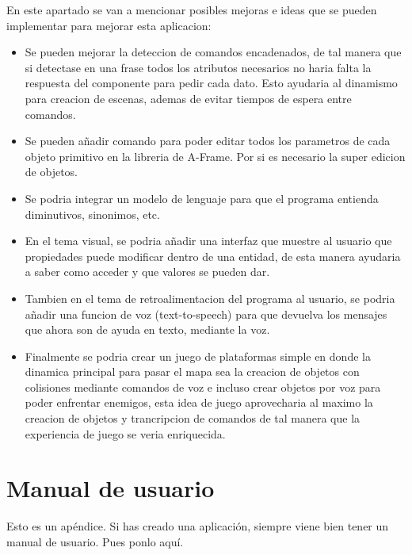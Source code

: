 \documentclass[a4paper, 12pt]{book}
\let\cleardoublepage\clearpage
\begin{document}
En este apartado se van a mencionar posibles mejoras e ideas que se pueden implementar para mejorar esta aplicacion:
\begin{itemize}
  \item Se pueden mejorar la deteccion de comandos encadenados, de tal manera que si detectase en una frase todos los atributos necesarios no haria falta la respuesta del componente para pedir cada dato.
  Esto ayudaria al dinamismo para creacion de escenas, ademas de evitar tiempos de espera entre comandos.
  \item Se pueden añadir comando para poder editar todos los parametros de cada objeto primitivo en la libreria de A-Frame. Por si es necesario la super edicion de objetos.
  \item Se podria integrar un modelo de lenguaje para que el programa entienda diminutivos, sinonimos, etc.
  \item En el tema visual, se podria añadir una interfaz que muestre al usuario que propiedades puede modificar dentro de una entidad, de esta manera ayudaria a saber como acceder y que valores se pueden dar.
  \item Tambien en el tema de retroalimentacion del programa al usuario, se podria añadir una funcion de voz (text-to-speech) para que devuelva los mensajes que ahora son de ayuda en texto, mediante la voz.
  \item Finalmente se podria crear un juego de plataformas simple en donde la dinamica principal para pasar el mapa sea la creacion de objetos con colisiones mediante comandos de voz e incluso crear objetos por voz para poder enfrentar enemigos, esta idea de juego aprovecharia al maximo la creacion de objetos y trancripcion de comandos de tal manera que la experiencia de juego se veria enriquecida.
\end{itemize}
\cleardoublepage
\appendix
\chapter{Manual de usuario}
\label{app:manual}

Esto es un apéndice.
Si has creado una aplicación, siempre viene bien tener un manual de usuario.
Pues ponlo aquí.


\cleardoublepage


\end{document}
